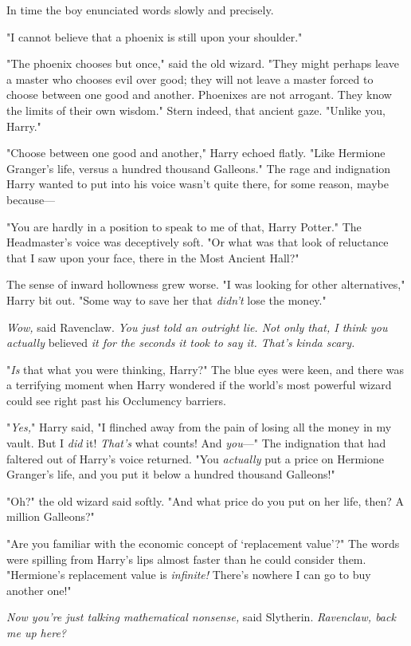 In time the boy enunciated words slowly and precisely.

"I cannot believe that a phoenix is still upon your shoulder."

"The phoenix chooses but once," said the old wizard. "They might perhaps leave
a master who chooses evil over good; they will not leave a master forced to
choose between one good and another. Phoenixes are not arrogant. They know the
limits of their own wisdom." Stern indeed, that ancient gaze. "Unlike you,
Harry."

"Choose between one good and another," Harry echoed flatly. "Like Hermione
Granger's life, versus a hundred thousand Galleons." The rage and indignation
Harry wanted to put into his voice wasn't quite there, for some reason, maybe
because—

"You are hardly in a position to speak to me of that, Harry Potter." The
Headmaster's voice was deceptively soft. "Or what was that look of reluctance
that I saw upon your face, there in the Most Ancient Hall?"

The sense of inward hollowness grew worse. "I was looking for other
alternatives," Harry bit out. "Some way to save her that \emph{didn't} lose the
money."

\emph{Wow,} said Ravenclaw. \emph{You just told an outright lie. Not only that,
I think you actually} believed \emph{it for the seconds it took to say it.
That's kinda scary.}

"\emph{Is} that what you were thinking, Harry?" The blue eyes were keen, and
there was a terrifying moment when Harry wondered if the world's most powerful
wizard could see right past his Occlumency barriers.

"\emph{Yes,}" Harry said, "I flinched away from the pain of losing all the
money in my vault. But I \emph{did} it! \emph{That's} what counts! And
\emph{you}—" The indignation that had faltered out of Harry's voice returned.
"You \emph{actually} put a price on Hermione Granger's life, and you put it
below a hundred thousand Galleons!"

"Oh?" the old wizard said softly. "And what price do you put on her life, then?
A million Galleons?"

"Are you familiar with the economic concept of `replacement value'?" The words
were spilling from Harry's lips almost faster than he could consider them.
"Hermione's replacement value is \emph{infinite!} There's nowhere I can go to
buy another one!"

\emph{Now you're just talking mathematical nonsense,} said Slytherin.
\emph{Ravenclaw, back me up here?}

